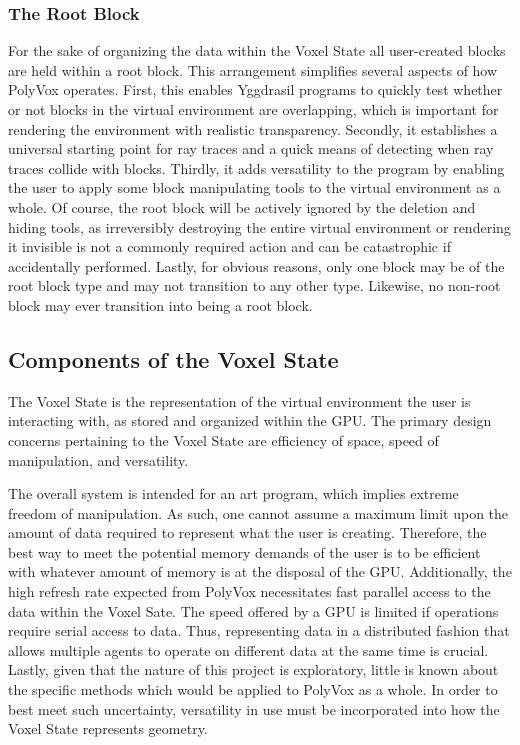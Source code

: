 \documentclass[onecolumn, draftclsnofoot,10pt, compsoc]{IEEEtran}
\begin{document}
\subsubsection{The Root Block}

For the sake of organizing the data within the Voxel State all user-created blocks are held within a root block. This arrangement simplifies several aspects of how PolyVox operates. First, this enables Yggdrasil programs to quickly test whether or not blocks in the virtual environment are overlapping, which is important for rendering the environment with realistic transparency. Secondly, it establishes a universal starting point for ray traces and a quick means of detecting when ray traces collide with blocks. Thirdly, it adds versatility to the program by enabling the user to apply some block manipulating tools to the virtual environment as a whole. Of course, the root block will be actively ignored by the deletion and hiding tools, as irreversibly destroying the entire virtual environment or rendering it invisible is not a commonly required action and can be catastrophic if accidentally performed. Lastly, for obvious reasons, only one block may be of the root block type and may not transition to any other type. Likewise, no non-root block may ever transition into being a root block.




\subsection{Components of the Voxel State}

The Voxel State is the representation of the virtual environment the user is interacting with, as stored and organized within the GPU. The primary design concerns pertaining to the Voxel State are efficiency of space, speed of manipulation, and versatility. 

The overall system is intended for an art program, which implies extreme freedom of manipulation. As such, one cannot assume a maximum limit upon the amount of data required to represent what the user is creating. Therefore, the best way to meet the potential memory demands of the user is to be efficient with whatever amount of memory is at the disposal of the GPU. Additionally, the high refresh rate expected from PolyVox necessitates fast parallel access to the data within the Voxel Sate. The speed offered by a GPU is limited if operations require serial access to data. Thus, representing data in a distributed fashion that allows multiple agents to operate on different data at the same time is crucial. Lastly, given that the nature of this project is exploratory, little is known about the specific methods which would be applied to PolyVox as a whole. In order to best meet such uncertainty, versatility in use must be incorporated into how the Voxel State represents geometry.
\end{document}

